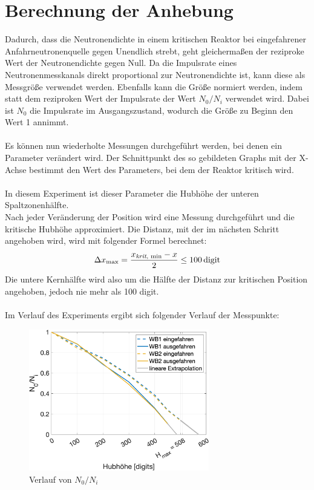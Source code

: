 \documentclass[12pt,german]{article}
\begin{document}
    \section{Berechnung der Anhebung}
    Dadurch, dass die Neutronendichte in einem kritischen Reaktor bei eingefahrener Anfahrneutronenquelle gegen Unendlich strebt, geht gleichermaßen der reziproke Wert der Neutronendichte gegen Null.
    Da die Impulsrate eines Neutronenmesskanals direkt proportional zur Neutronendichte ist, kann diese als Messgröße verwendet werden.
    Ebenfalls kann die Größe normiert werden, indem statt dem reziproken Wert der Impulsrate der Wert $N_0 / N_i$ verwendet wird. Dabei ist $N_0$ die Impulsrate im Ausgangszustand, wodurch die Größe zu Beginn den Wert 1 annimmt.
    \\ \\
    Es können nun wiederholte Messungen durchgeführt werden, bei denen ein Parameter verändert wird. Der Schnittpunkt des so gebildeten Graphs mit der X-Achse bestimmt den Wert des Parameters, bei dem der Reaktor kritisch wird.
    \\ \\
    In diesem Experiment ist dieser Parameter die Hubhöhe der unteren Spaltzonenhälfte.
    \\
    Nach jeder Veränderung der Position wird eine Messung durchgeführt und die kritische Hubhöhe approximiert. Die Distanz, mit der im nächsten Schritt angehoben wird, wird mit folgender Formel berechnet:
    \begin{align*}
        \Delta x_\text{max} = \frac{x_\text{\emph{krit}, min} - x}{2} \leq 100\, \text{digit}
    \end{align*}
    Die untere Kernhälfte wird also um die Hälfte der Distanz zur kritischen Position angehoben, jedoch nie mehr als 100 digit.
    \\ \\
    Im Verlauf des Experiments ergibt sich folgender Verlauf der Messpunkte:
    \begin{figure}[H]
        \centering
        \includegraphics[width=0.7\textwidth]{relativeCount.png}
        \caption{Verlauf von $N_0 / N_i$}
        \label{fig:relativeCount}
    \end{figure}
\end{document}
